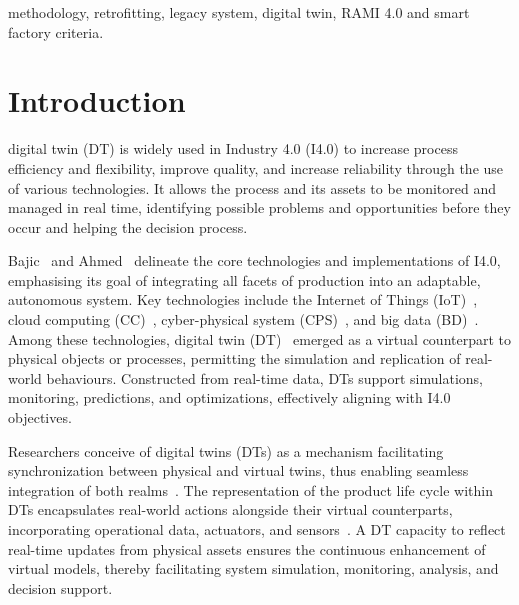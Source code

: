 \documentclass[journal]{IEEEtran}
\begin{document}
\begin{IEEEkeywords}
methodology, retrofitting, legacy system, digital twin, RAMI 4.0 and smart factory criteria.
\end{IEEEkeywords}



%
\IEEEpeerreviewmaketitle


\section{Introduction}

 digital twin (DT) is widely used in Industry 4.0 (I4.0) to increase process efficiency and flexibility, improve quality, and increase reliability through the use of various technologies. It allows the process and its assets to be monitored and managed in real time, identifying possible problems and opportunities before they occur and helping the decision process.

Bajic~\cite{Bajic2021} and Ahmed~\cite{Ahmed2022} delineate the core technologies and implementations of I4.0, emphasising its goal of integrating all facets of production into an adaptable, autonomous system. Key technologies include the Internet of Things (IoT)~\cite{Garg2020}, cloud computing (CC)~\cite{Mahmud2020}, cyber-physical system (CPS)~\cite{Fraga2020, Sinha2020}, and big data (BD)~\cite{Nguyen2020, Qi2018}. Among these technologies, digital twin (DT)~\cite{Schroeder2021} emerged as a virtual counterpart to physical objects or processes, permitting the simulation and replication of real-world behaviours. Constructed from real-time data, DTs support simulations, monitoring, predictions, and optimizations, effectively aligning with I4.0 objectives.

Researchers conceive of digital twins (DTs) as a mechanism facilitating synchronization between physical and virtual twins, thus enabling seamless integration of both realms~\cite{Wanasinghe2020, Turner2021}. The representation of the product life cycle within DTs encapsulates real-world actions alongside their virtual counterparts, incorporating operational data, actuators, and sensors~\cite{Mihai2022}. A DT capacity to reflect real-time updates from physical assets ensures the continuous enhancement of virtual models, thereby facilitating system simulation, monitoring, analysis, and decision support.
\end{document}

